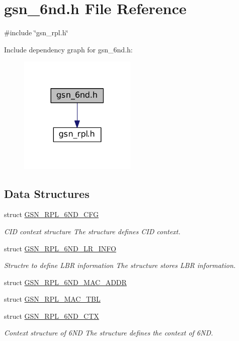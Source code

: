 \hypertarget{a00473}{
\section{gsn\_\-6nd.h File Reference}
\label{a00473}
}
{\ttfamily \#include \char`\"{}gsn\_\-rpl.h\char`\"{}}\par
Include dependency graph for gsn\_\-6nd.h:
\nopagebreak
\begin{figure}[H]
\begin{center}
\leavevmode
\includegraphics[width=158pt]{a00696}
\end{center}
\end{figure}
\subsection*{Data Structures}
\begin{DoxyCompactItemize}
\item 
struct \hyperlink{a00193}{GSN\_\-RPL\_\-6ND\_\-CFG}
\begin{DoxyCompactList}\small\item\em CID context structure The structure defines CID context. \end{DoxyCompactList}\item 
struct \hyperlink{a00195}{GSN\_\-RPL\_\-6ND\_\-LR\_\-INFO}
\begin{DoxyCompactList}\small\item\em Structre to define LBR information The structure stores LBR information. \end{DoxyCompactList}\item 
struct \hyperlink{a00196}{GSN\_\-RPL\_\-6ND\_\-MAC\_\-ADDR}
\item 
struct \hyperlink{a00204}{GSN\_\-RPL\_\-MAC\_\-TBL}
\item 
struct \hyperlink{a00194}{GSN\_\-RPL\_\-6ND\_\-CTX}
\begin{DoxyCompactList}\small\item\em Context structure of 6ND The structure defines the context of 6ND. \end{DoxyCompactList}\end{DoxyCompactItemize}

